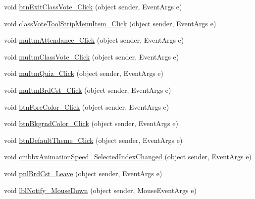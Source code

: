 \begin{DoxyCompactItemize}
\item 
void \hyperlink{class_sr_p___classroom_inq_1_1frm_classrrom_inq_a7de1b5ffee595dda863be7b2299e0e38}{btn\-Exit\-Class\-Vote\-\_\-\-Click} (object sender, \-Event\-Args e)
\item 
void \hyperlink{class_sr_p___classroom_inq_1_1frm_classrrom_inq_ac11a0a3ff559ed2ade5c661899ff300a}{class\-Vote\-Tool\-Strip\-Menu\-Item\-\_\-\-Click} (object sender, \-Event\-Args e)
\item 
void \hyperlink{class_sr_p___classroom_inq_1_1frm_classrrom_inq_a0901d9ca016f018ca62acc5dc4864171}{mu\-Itm\-Attendance\-\_\-\-Click} (object sender, \-Event\-Args e)
\item 
void \hyperlink{class_sr_p___classroom_inq_1_1frm_classrrom_inq_aefa97cd598657ba7e2f095570db36a28}{mu\-Itm\-Class\-Vote\-\_\-\-Click} (object sender, \-Event\-Args e)
\item 
void \hyperlink{class_sr_p___classroom_inq_1_1frm_classrrom_inq_ac5f95d502012ae69fb0b94d64709dbcc}{mu\-Itm\-Quiz\-\_\-\-Click} (object sender, \-Event\-Args e)
\item 
void \hyperlink{class_sr_p___classroom_inq_1_1frm_classrrom_inq_ae97f71a555c40b1051056bf469ae34e7}{mu\-Itm\-Brd\-Cst\-\_\-\-Click} (object sender, \-Event\-Args e)
\item 
void \hyperlink{class_sr_p___classroom_inq_1_1frm_classrrom_inq_a52b78a0b5e0c3ec96fd0bea61c4d7d41}{btn\-Fore\-Color\-\_\-\-Click} (object sender, \-Event\-Args e)
\item 
void \hyperlink{class_sr_p___classroom_inq_1_1frm_classrrom_inq_a8b831d65094ba0fb57078609dec70be6}{btn\-Bkgrnd\-Color\-\_\-\-Click} (object sender, \-Event\-Args e)
\item 
void \hyperlink{class_sr_p___classroom_inq_1_1frm_classrrom_inq_a172ef16a523557b1225d32524bce6776}{btn\-Default\-Theme\-\_\-\-Click} (object sender, \-Event\-Args e)
\item 
void \hyperlink{class_sr_p___classroom_inq_1_1frm_classrrom_inq_a0a93893a224bd683a08e78c13bd44802}{cmbbx\-Animation\-Speed\-\_\-\-Selected\-Index\-Changed} (object sender, \-Event\-Args e)
\item 
void \hyperlink{class_sr_p___classroom_inq_1_1frm_classrrom_inq_a999a3138a18a94d736d0d9460a5d6f2a}{pnl\-Brd\-Cst\-\_\-\-Leave} (object sender, \-Event\-Args e)
\item 
void \hyperlink{class_sr_p___classroom_inq_1_1frm_classrrom_inq_a44187a1b3f84dba71b1e726ef6468cd1}{lbl\-Notify\-\_\-\-Mouse\-Down} (object sender, \-Mouse\-Event\-Args e)
\item 

\end{DoxyCompactItemize}
